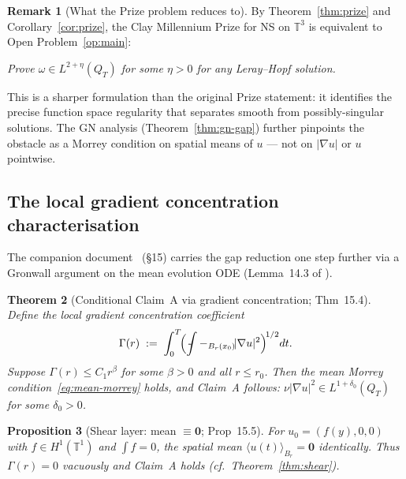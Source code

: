 \documentclass[11pt]{article}
\newtheorem{theorem}{Theorem}[section]
\newtheorem{proposition}[theorem]{Proposition}
\theoremstyle{definition}
\newtheorem{remark}[theorem]{Remark}
\theoremstyle{remark}
\newcommand{\T}{\mathbb{T}}
\newcommand{\grad}{\nabla}
\newcommand{\Xint}{\mathop{\,\rlap{-}\!\!\int}\nolimits}
\newcommand{\dlt}{\delta}
\begin{document}
\begin{remark}[What the Prize problem reduces to]
  By Theorem~\ref{thm:prize} and Corollary~\ref{cor:prize}, the Clay
  Millennium Prize for NS on $\T^3$ is equivalent to Open
  Problem~\ref{op:main}:
  \begin{center}
  \emph{Prove $\omega\in L^{2+\eta}(Q_T)$ for some $\eta>0$
  for any Leray--Hopf solution.}
  \end{center}
  This is a sharper formulation than the original Prize statement: it
  identifies the precise function space regularity that separates
  smooth from possibly-singular solutions.
  The GN analysis (Theorem~\ref{thm:gn-gap}) further pinpoints the obstacle
  as a Morrey condition on spatial means of $u$ — not on $|\grad u|$ or $u$ pointwise.
\end{remark}

\subsection{The local gradient concentration characterisation}
\label{sec:grad-concentration}

The companion document~\cite{WorkingProof2026} (§15) carries the gap reduction
one step further via a Gronwall argument on the mean evolution ODE
(Lemma~14.3 of \cite{WorkingProof2026}).

\begin{theorem}[Conditional Claim~A via gradient concentration;
  \cite{WorkingProof2026} Thm~15.4]
\label{thm:grad-concentration}
  Define the local gradient concentration coefficient
  \begin{equation}\label{eq:Gamma}
    \Gamma(r) \;:=\; \int_0^T\!\Bigl(\Xint-_{B_r(x_0)}\!|\grad u|^2\Bigr)^{\!1/2}dt.
  \end{equation}
  Suppose $\Gamma(r)\leq C_1 r^\beta$ for some $\beta>0$ and all $r\leq r_0$.
  Then the mean Morrey condition~\eqref{eq:mean-morrey} holds, and
  Claim~A follows: $\nu|\grad u|^2\in L^{1+\dlt_0}(Q_T)$ for some $\dlt_0>0$.
\end{theorem}

\begin{proposition}[Shear layer: mean $\equiv\mathbf{0}$;
  \cite{WorkingProof2026} Prop~15.5]
\label{prop:shear-mean-zero-p6}
  For $u_0=(f(y),0,0)$ with $f\in H^1(\T^1)$ and $\int f=0$,
  the spatial mean $\langle u(t)\rangle_{B_r}=\mathbf{0}$ identically.
  Thus $\Gamma(r)=0$ vacuously and Claim~A holds (cf.\ Theorem~\ref{thm:shear}).
\end{proposition}
\end{document}
